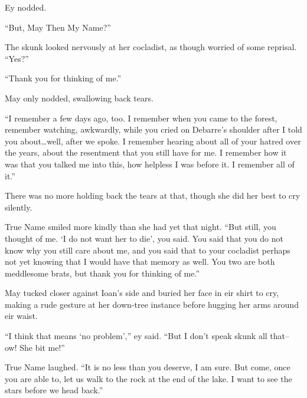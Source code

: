 Ey nodded.

``But, May Then My Name?''

The skunk looked nervously at her cocladist, as though worried of some reprisal. ``Yes?''

``Thank you for thinking of me.''

May only nodded, swallowing back tears.

``I remember a few days ago, too. I remember when you came to the forest, remember watching, awkwardly, while you cried on Debarre's shoulder after I told you about\ldots well, after we spoke. I remember hearing about all of your hatred over the years, about the resentment that you still have for me. I remember how it was that you talked me into this, how helpless I was before it. I remember all of it.''

There was no more holding back the tears at that, though she did her best to cry silently.

True Name smiled more kindly than she had yet that night. ``But still, you thought of me. `I do not want her to die', you said. You said that you do not know why you still care about me, and you said that to your cocladist perhaps not yet knowing that I would have that memory as well. You two are both meddlesome brats, but thank you for thinking of me.''

May tucked closer against Ioan's side and buried her face in eir shirt to cry, making a rude gesture at her down-tree instance before hugging her arms around eir waist.

``I think that means `no problem','' ey said. ``But I don't speak skunk all that-- ow! She bit me!''

True Name laughed. ``It is no less than you deserve, I am sure. But come, once you are able to, let us walk to the rock at the end of the lake. I want to see the stars before we head back.''
